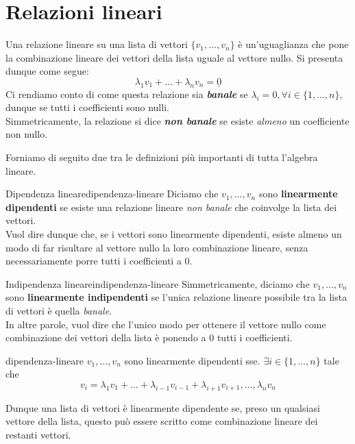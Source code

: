 \documentclass[12pt]{report}
\newcommand{\vectors}[1]{#1_1, \dots, #1_n}
\newcommand{\nullvector}{\underline{0}}
\begin{document}
	\section{Relazioni lineari}
	Una relazione lineare su una lista di vettori $\{\vectors{v}\}$ è un'uguaglianza che pone la combinazione lineare dei vettori della lista uguale al vettore nullo. Si presenta dunque come segue:
	\[
		\lambda_1v_1 + \dots + \lambda_nv_n = \nullvector
	\]
	Ci rendiamo conto di come questa relazione sia \textit{\textbf{banale}} se $\lambda_i = 0, \forall i \in \{1, \dots, n\}$, dunque se tutti i coefficienti sono nulli.\\
	Simmetricamente, la relazione si dice \textit{\textbf{non banale}} se esiste \textit{almeno} un coefficiente non nullo.
	
	Forniamo di seguito due tra le definizioni più importanti di tutta l'algebra lineare.
	
	\begin{definizione}{Dipendenza lineare}{dipendenza-lineare}
		Diciamo che $\vectors{v}$ sono \textbf{linearmente dipendenti} se esiste una relazione lineare \textit{non banale} che coinvolge la lista dei vettori.\\
		Vuol dire dunque che, se i vettori sono linearmente dipendenti, esiste almeno un modo di far risultare al vettore nullo la loro combinazione lineare, senza necessariamente porre tutti i coefficienti a $0$.
	\end{definizione}
	
	\begin{definizione}{Indipendenza lineare}{indipendenza-lineare}
		Simmetricamente, diciamo che $\vectors{v}$ sono \textbf{linearmente indipendenti} se l'unica relazione lineare possibile tra la lista di vettori è quella \textit{banale}.\\
		In altre parole, vuol dire che l'unico modo per ottenere il vettore nullo come combinazione dei vettori della lista è ponendo a $0$ tutti i coefficienti.
	\end{definizione}
	
	\begin{proposizione}{}{dipendenza-lineare}
		$\vectors{v}$ sono linearmente dipendenti sse. $\exists i \in \{1, \dots, n\}$ tale che
		\[
			v_i = \lambda_1v_1 + \dots + \lambda_{i-1}v_{i-1} + \lambda_{i+1}v_{i+1}, \dots, \lambda_nv_n
		\]
	\end{proposizione}
	Dunque una lista di vettori è linearmente dipendente se, preso un qualsiasi vettore della lista, questo può essere scritto come combinazione lineare dei restanti vettori.
	
\end{document}
